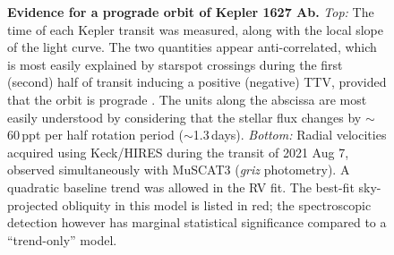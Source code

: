 \documentclass[12pt,modern,twocolumn,tighten]{aastex63}
\begin{document}
\begin{figure}[tp]
	\begin{center}
		\leavevmode
		
	\end{center}
	\vspace{-0.7cm}
	\caption{
		{\bf Evidence for a prograde orbit of Kepler 1627 Ab.}
    {\it Top:} 
    The time of each Kepler transit was measured, along with the local
    slope of the light curve.  The two quantities appear
    anti-correlated, which is most easily explained by starspot
    crossings during the first (second) half of transit inducing a
    positive (negative) TTV, provided that the orbit is prograde
    \citep{mazeh_time_2015}.  The units along the abscissa are most
    easily understood by considering that the stellar flux
    changes by $\sim$60\,ppt per half rotation period
    ($\sim$1.3\,days).
    {\it Bottom:} Radial velocities acquired using Keck/HIRES during
    the transit of 2021 Aug 7, observed simultaneously with MuSCAT3
    ({\it griz} photometry).  A quadratic baseline trend was allowed
    in the RV fit.  The best-fit sky-projected obliquity in this model
    is listed in red; the spectroscopic detection however has marginal statistical
    significance compared to a ``trend-only'' model.
    \label{fig:obliquity}
	}
\end{figure}
\end{document}
